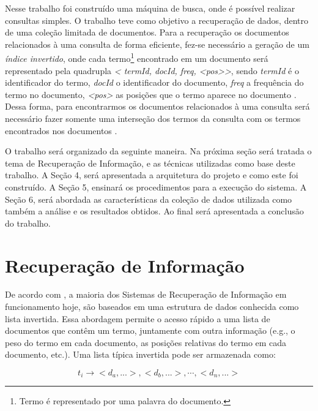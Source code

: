 \documentclass[12pt]{article}
\begin{document}
Nesse trabalho foi construído uma máquina de busca, onde é possível realizar consultas simples. O trabalho teve como objetivo a recuperação de dados, dentro de uma coleção limitada de documentos. Para a recuperação os documentos relacionados à uma consulta de forma eficiente, fez-se necessário a geração de um \textit{índice invertido}, onde cada termo\footnote{Termo é representado por uma palavra do documento.} encontrado em um documento será representado pela quadrupla \textit{< termId, docId, freq, <pos>>}, sendo \textit{termId} é o identificador do termo, \textit{docId} o identificador do documento, \textit{freq} a frequência do termo no documento, \textit{<pos>} as posições que o termo aparece no documento \cite{witten1999managing}. Dessa forma, para encontrarmos os documentos relacionados à uma consulta será necessário fazer somente uma interseção dos termos da consulta  com os termos encontrados nos documentos .

O trabalho será organizado da seguinte maneira. Na próxima seção será tratada o tema de Recuperação de Informação, e as técnicas utilizadas como base deste trabalho. A Seção 4, será apresentada a arquitetura do projeto e como este foi construído. A Seção 5, ensinará os procedimentos para a execução do sistema. A Seção 6, será abordada as características da coleção de dados utilizada como também a análise e os resultados obtidos. Ao final será apresentada a conclusão do trabalho.

\section{Recuperação de Informação} \label{sec:ir}

De acordo com \cite{singhal2001modern}, a maioria dos Sistemas de Recuperação de Informação em funcionamento hoje, são baseados em uma estrutura de dados conhecida como lista invertida. Essa abordagem permite o acesso rápido a uma lista de documentos que contêm um termo, juntamente com outra informação (e.g., o peso do termo em cada documento, as posições relativas do termo em cada documento, etc.). Uma lista típica invertida pode ser armazenada como:

\begin{equation}
\label{eq:inverted_index}
  t_i \to <d_a, ...>,<d_b, ...>,\cdots,<d_n, ...>
\end{equation}
\end{document}
